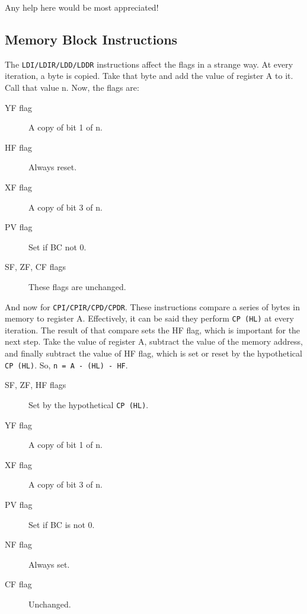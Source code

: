 Any help here would be most appreciated!


\subsection{Memory Block Instructions \cite{mrison}}
\label{block_mem}

The {\tt LDI/LDIR/LDD/LDDR} instructions affect the flags in a strange way. At every iteration, a byte is copied. Take that byte and add the value of register A to it. Call that value n. Now, the flags are:

\begin{description}
 
    \item[YF flag]
    A copy of bit 1 of n.

    \item[HF flag]
    Always reset.

    \item[XF flag]
    A copy of bit 3 of n.

    \item[PV flag]
    Set if BC not 0.

    \item[SF, ZF, CF flags]
    These flags are unchanged.

\end{description}

And now for {\tt CPI/CPIR/CPD/CPDR}. These instructions compare a series of bytes in memory to register A. Effectively, it can be said they perform {\tt CP (HL)} at every iteration. The result of that compare sets the HF flag, which is important for the next step. Take the value of register A, subtract the value of the memory address, and finally subtract the value of HF flag, which is set or reset by the hypothetical {\tt CP (HL)}. So, {\tt n = A - (HL) - HF}.

\begin{description}

    \item[SF, ZF, HF flags]
    Set by the hypothetical {\tt CP (HL)}.

    \item[YF flag]
    A copy of bit 1 of n.

    \item[XF flag]
    A copy of bit 3 of n.

    \item[PV flag]
    Set if BC is not 0.

    \item[NF flag]
    Always set.

    \item[CF flag]
    Unchanged.

\end{description}


